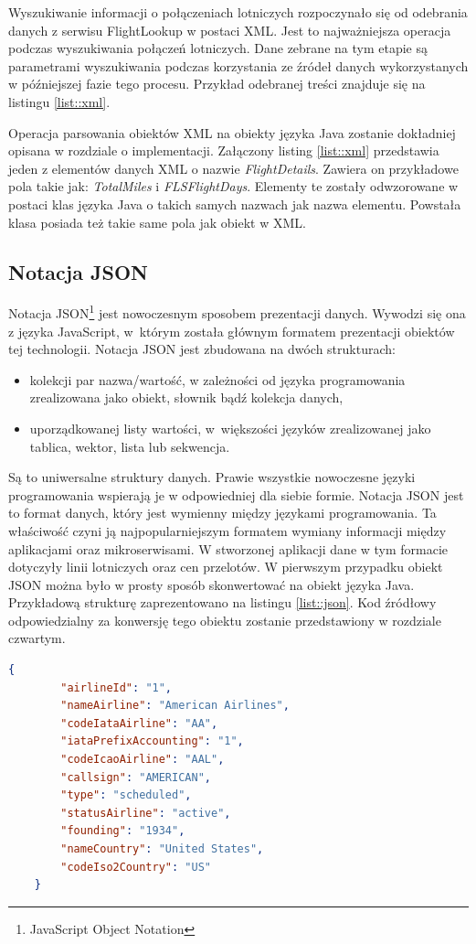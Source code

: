 \documentclass[12pt, twoside]{report}
\begin{document}
Wyszukiwanie informacji o połączeniach lotniczych rozpoczynało się od odebrania danych z serwisu FlightLookup w postaci XML. Jest to najważniejsza operacja podczas wyszukiwania połączeń lotniczych. Dane zebrane na tym etapie są parametrami wyszukiwania podczas korzystania ze źródeł danych wykorzystanych w późniejszej fazie tego procesu. Przykład odebranej treści znajduje się na listingu \ref{list::xml}.

Operacja parsowania obiektów XML na obiekty języka Java zostanie dokładniej opisana w rozdziale o implementacji. Załączony listing \ref{list::xml} przedstawia jeden z elementów danych XML o nazwie \textit{FlightDetails}. Zawiera on przykładowe pola takie jak: \textit{TotalMiles} i \textit{FLSFlightDays}. Elementy te zostały odwzorowane w postaci klas języka Java o takich samych nazwach jak nazwa elementu. Powstała klasa posiada też takie same pola jak obiekt w XML.

\subsection{Notacja JSON}
Notacja JSON\footnote{JavaScript Object Notation} jest nowoczesnym sposobem prezentacji danych. Wywodzi się ona z języka JavaScript, w~którym została głównym formatem prezentacji obiektów tej technologii. Notacja JSON jest zbudowana na dwóch strukturach:
\begin{itemize}[noitemsep,topsep=0pt]
\item kolekcji par nazwa/wartość, w zależności od języka programowania zrealizowana jako obiekt, słownik bądź kolekcja danych,
\item uporządkowanej listy wartości, w~większości języków zrealizowanej jako tablica, wektor, lista lub sekwencja.
\end{itemize}
Są to uniwersalne struktury danych. Prawie wszystkie nowoczesne języki programowania wspierają je w odpowiedniej dla siebie formie. Notacja JSON jest to format danych, który jest wymienny między językami programowania. Ta właściwość czyni ją najpopularniejszym formatem wymiany informacji między aplikacjami oraz mikroserwisami\cite{json}. W stworzonej aplikacji dane w tym formacie dotyczyły linii lotniczych oraz cen przelotów. W pierwszym przypadku obiekt JSON można było w prosty sposób skonwertować na obiekt języka Java. Przykładową strukturę zaprezentowano na listingu \ref{list::json}.
Kod źródłowy odpowiedzialny za konwersję tego obiektu zostanie przedstawiony w rozdziale czwartym.
\begin{lstlisting}[language=JSON, caption= Przykładowy obiekt w notacji JSON, label=list::json]
    {
        "airlineId": "1",
        "nameAirline": "American Airlines",
        "codeIataAirline": "AA",
        "iataPrefixAccounting": "1",
        "codeIcaoAirline": "AAL",
        "callsign": "AMERICAN",
        "type": "scheduled",
        "statusAirline": "active",
        "founding": "1934",
        "nameCountry": "United States",
        "codeIso2Country": "US"
    }
\end{lstlisting}
\end{document}

